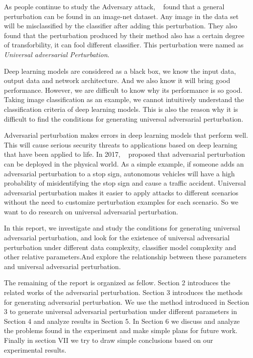 \documentclass{article}
\begin{document}
As people continue to study the Adversary attack, ~\cite{Moosavi-Dezfooli_2017_CVPR}  found that a general perturbation can be found in an image-net dataset. Any image in the data set will be misclassified by the classifier after adding this perturbation. They also found that the perturbation produced by their method also has a certain degree of transforbility, it can fool different classifier. This perturbation were named as \textit{Universal adversarial Perturbation}.

Deep learning models are considered as a black box, we know the input data, output data and network architecture. And we also know it will bring good performance. However, we are difficult to know why its performance is so good. Taking image classification as an example, we cannot intuitively understand the classification criteria of deep learning models. This is also the reason why it is difficult to find the conditions for generating universal adversarial perturbation. 

Adversarial perturbation makes errors in deep learning models that perform well. This will cause serious security threats to applications based on deep learning that have been applied to life. In 2017, ~\cite{Kurakin45818} proposed that adversarial perturbation can be deployed in the physical world. As a simple example, if someone adds an adversarial perturbation to a stop sign, autonomous vehicles will have a high probability of misidentifying the stop sign and cause a traffic accident. Universal adversarial perturbation makes it easier to apply attacks to different scenarios without the need to customize perturbation examples for each scenario. So we want to do research on universal adversarial perturbation.

In this report, we investigate and study the conditions for generating universal adversarial perturbation, and look for the existence of universal adversarial perturbation under different data complexity, classifier model complexity and other relative parameters.And explore the relationship between these parameters and universal adversarial perturbation.

The remaining of the report is organized as fellow. Section 2 introduces the related works of the adversarial perturbation. Section 3 introduces the methods for generating adversarial perturbation. We use the method introduced in Section 3 to generate universal adversarial perturbation under different parameters in Section 4 and analyze results in Section 5. In Section 6 we discuss and analyze the problems found in the experiment and make simple plans for future work. Finally in section VII we try to draw simple conclusions based on our experimental results.  
\end{document}
